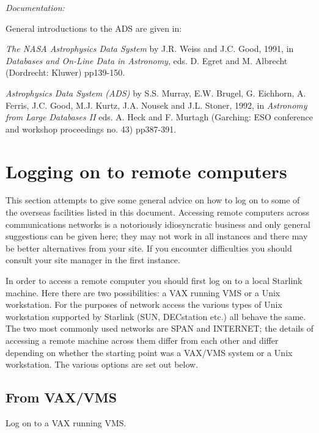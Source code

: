 {\it Documentation:}

General introductions to the ADS are given in:

 {\it The NASA Astrophysics Data System} by J.R. Weiss and J.C. Good, 
1991, in {\it Databases and On-Line Data in Astronomy}, eds. D. Egret 
and M. Albrecht (Dordrecht: Kluwer) pp139-150.

{\it Astrophysics Data System (ADS)} by S.S. Murray, E.W. Brugel, G. 
Eichhorn, A. Ferris, J.C. Good, M.J. Kurtz, J.A. Nousek and J.L. Stoner,
1992, in {\it Astronomy from Large Databases II} eds. A. Heck and F. 
Murtagh (Garching: ESO conference and workshop proceedings no. 43) 
pp387-391.

\section{Logging on to remote computers
\label{REMOTE}}

This section attempts to give some general advice on how to log on to
some of the overseas facilities listed in this document. Accessing 
remote computers across communications networks is a notoriously 
idiosyncratic business and only general suggestions can be given here; 
they may not work in all instances and there may be better alternatives 
from your site. If you encounter difficulties you should consult your 
site manager in the first instance.

In order to access a remote computer you should first log on to a local
Starlink machine. Here there are two possibilities: a VAX running VMS
or a Unix workstation. For the purposes of network access the various
types of Unix workstation supported by Starlink (SUN, DECstation etc.)
all behave the same. The two most commonly used networks are SPAN and
INTERNET; the details of accessing a remote machine across them differ
from each other and differ depending on whether the starting point was
a VAX/VMS system or a Unix workstation. The various options are set out
below.

\subsection{From VAX/VMS}

Log on to a VAX running VMS.

